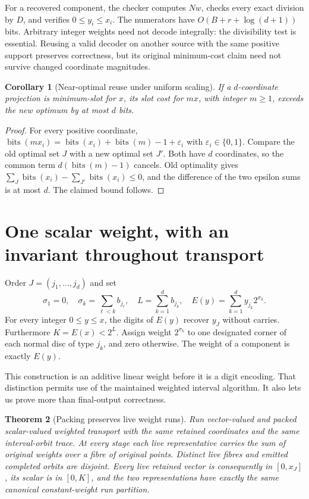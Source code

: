 \documentclass[11pt,a4paper]{article}
\newtheorem{theorem}{Theorem}[section]
\newtheorem{corollary}[theorem]{Corollary}
\theoremstyle{definition}
\newcommand{\bits}{\operatorname{bits}}
\begin{document}
For a recovered component, the checker computes $Nw$, checks every exact
division by $D$, and verifies $0\le y_i\le x_i$.  The numerators have
$O(B+r+\log(d+1))$ bits.  Arbitrary integer weights need not decode integrally:
the divisibility test is essential.  Reusing a valid decoder on another source
with the same positive support preserves correctness, but its original
minimum-cost claim need not survive changed coordinate magnitudes.

\begin{corollary}[Near-optimal reuse under uniform scaling]
\label{cor:scaling}
If a $d$-coordinate projection is minimum-slot for $x$, its slot cost for
$mx$, with integer $m\ge1$, exceeds the new optimum by at most $d$ bits.
\end{corollary}
\begin{proof}
For every positive coordinate,
$\bits(mx_i)=\bits(x_i)+\bits(m)-1+\varepsilon_i$ with
$\varepsilon_i\in\{0,1\}$.  Compare the old optimal set $J$ with a new optimal
set $J'$.  Both have $d$ coordinates, so the common term
$d(\bits(m)-1)$ cancels.  Old optimality gives
$\sum_J\bits(x_i)-\sum_{J'}\bits(x_i)\le0$, and the difference of the two
epsilon sums is at most $d$.  The claimed bound follows.
\end{proof}

\section{One scalar weight, with an invariant throughout transport}
\label{sec:packing}

Order $J=(j_1,\ldots,j_d)$ and set
\begin{equation}
 \sigma_1=0,\quad \sigma_k=\sum_{\ell<k}b_{j_\ell},\quad
 L=\sum_{k=1}^d b_{j_k},\quad
 E(y)=\sum_{k=1}^d y_{j_k}2^{\sigma_k}.       \label{eq:packing}
\end{equation}
For every integer $0\le y\le x$, the digits of $E(y)$ recover $y_J$ without
carries.  Furthermore $K=E(x)<2^L$.  Assign weight $2^{\sigma_k}$ to one
designated corner of each normal disc of type $j_k$, and zero otherwise.
The weight of a component is exactly $E(y)$.

This construction is an additive linear weight before it is a digit encoding.
That distinction permits use of the maintained weighted interval algorithm.
It also lets us prove more than final-output correctness.

\begin{theorem}[Packing preserves live weight runs]
\label{thm:packing}
Run vector-valued and packed scalar-valued weighted transport with the same
retained coordinates and the same interval-orbit trace.  At every stage each
live representative carries the sum of original weights over a fibre of
original points.  Distinct live fibres and emitted completed orbits are
disjoint.  Every live retained vector is consequently in $[0,x_J]$, its scalar
is in $[0,K]$, and the two representations have exactly the same canonical
constant-weight run partition.
\end{theorem}
\end{document}
